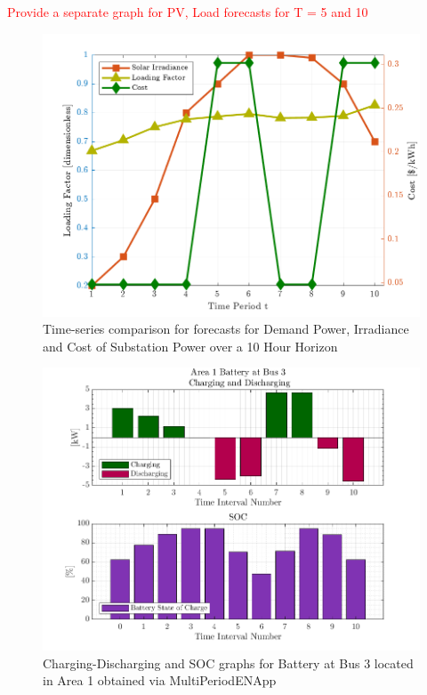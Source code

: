\documentclass[../../outputs/main.tex]{subfiles}
\begin{document}
\textcolor{red}{Provide a separate graph for PV, Load forecasts for T = 5 and 10}

\begin{figure}[h!]
    \centering
    \includegraphics[height=0.25\textheight]{../figures/T10-inputCurves/InputCurves_Horizon_10.png}
    \caption{Time-series comparison for forecasts for Demand Power, Irradiance and Cost of Substation Power over a 10 Hour Horizon}
    \label{fig:inputCurve-10}
\end{figure}



\begin{figure}[h!]
    \centering
    \includegraphics[width=\linewidth]{../figures/T10-pv20-batt30-genCost/dopf/BatteryPlots/macroItr_5_genCost_Battery_1_alpha_0.001.png}
    \caption{Charging-Discharging and SOC graphs for Battery at Bus 3 located in Area 1 obtained via MultiPeriodENApp}
    \label{fig:batt-plot-dopf-10-20-30-genCost}
\end{figure}
    

\lipsum[1]
\end{document}
